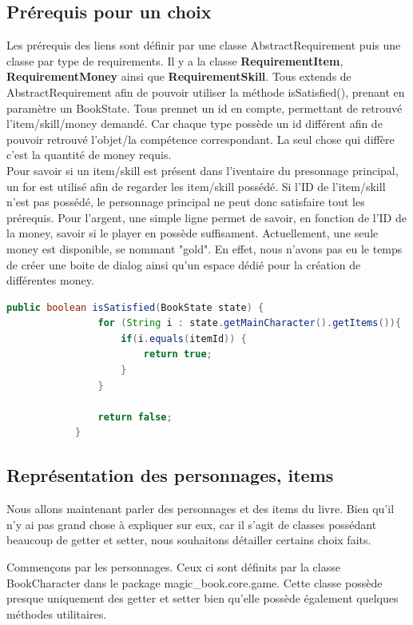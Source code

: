 		\subsection{Prérequis pour un choix}
			Les prérequis des liens sont définir par une classe AbstractRequirement puis une classe par type de requirements. Il y a la classe \textbf{RequirementItem}, \textbf{RequirementMoney} ainsi que \textbf{RequirementSkill}. Tous extends de AbstractRequirement afin de pouvoir utiliser la méthode isSatisfied(), prenant en paramètre un BookState. Tous prennet un id en compte, permettant de retrouvé l'item/skill/money demandé. Car chaque type possède un id différent afin de pouvoir retrouvé l'objet/la compétence correspondant. La seul chose qui diffère c'est la quantité de money requis.\\
			Pour savoir si un item/skill est présent dans l'iventaire du presonnage principal, un for est utilisé afin de regarder les item/skill possédé. Si l'ID de l'item/skill n'est pas possédé, le personnage principal ne peut donc satisfaire tout les prérequis. Pour l'argent, une simple ligne permet de savoir, en fonction de l'ID de la money, savoir si le player en possède suffisament. Actuellement, une seule money est disponible, se nommant "gold". En effet, nous n'avons pas eu le temps de créer une boite de dialog ainsi qu'un espace dédié pour la création de différentes money.
			\begin{lstlisting}[language=java, caption=exemple de isSatisfied(), label=isSatisfied]
			public boolean isSatisfied(BookState state) {
				for (String i : state.getMainCharacter().getItems()){
					if(i.equals(itemId)) {
						return true;
					}
				}

				return false;
			}
			\end{lstlisting}


		\subsection{Représentation des personnages, items}

			Nous allons maintenant parler des personnages et des items du livre. Bien qu'il n'y ai pas grand chose à expliquer sur eux, car il s'agit de classes possédant beaucoup de getter et setter, nous souhaitons détailler certains choix faits.

			Commençons par les personnages. Ceux ci sont définits par la classe BookCharacter dans le package magic\_book.core.game. Cette classe possède presque uniquement des getter et setter bien qu'elle possède également quelques méthodes utilitaires.

